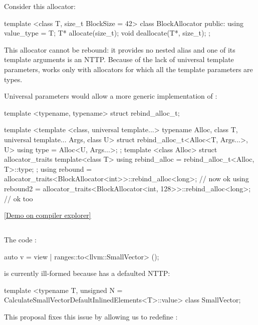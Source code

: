 \documentclass{wg21}
\begin{document}
Consider this allocator:

\begin{colorblock}
template <class T, size_t BlockSize = 42>
class BlockAllocator {
    public:
    using value_type = T;
    T* allocate(size_t);
    void deallocate(T*, size_t);
};
\end{colorblock}


This allocator cannot be rebound: it provides no  nested alias and one of its template arguments is an NTTP.
Because of the lack of universal template parameters,  works only with allocators for which all the template parameters are types.

Universal parameters would allow a more generic implementation of :


\begin{colorblock}
template <typename, typename>
struct rebind_alloc_t;

template <template <class, universal template...> typename Alloc, class T, universal template... Args, class U>
struct rebind_alloc_t<Alloc<T, Args...>, U> {
    using type = Alloc<U, Args...>;
};
template <class Alloc>
struct allocator_traits {
    template<class T>
    using rebind_alloc = rebind_alloc_t<Alloc, T>::type;
};
using rebound = allocator_traits<BlockAllocator<int>>::rebind_alloc<long>; // now ok
using rebound2 = allocator_traits<BlockAllocator<int, 128>>::rebind_alloc<long>; // ok too
\end{colorblock}

\href{https://gcc.godbolt.org/z/7a5YrT47Y}{[Demo on compiler explorer]}

\subsection{}

The code :

\begin{colorblock}
auto v = view | ranges::to<llvm::SmallVector> ();
\end{colorblock}

is currently ill-formed because  has a defaulted NTTP:

\begin{colorblock}
template <typename T, unsigned N = CalculateSmallVectorDefaultInlinedElements<T>::value>
class SmallVector;
\end{colorblock}

This proposal fixes this issue by allowing us to redefine :
\end{document}
